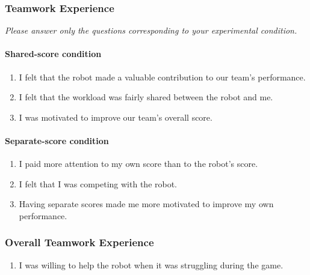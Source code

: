 \subsubsection{Teamwork Experience}

\textit{Please answer only the questions corresponding to your experimental condition.}

\paragraph{Shared-score condition}

\begin{enumerate}[leftmargin=*, itemsep=0.8em, start=6]

    \item I felt that the robot made a valuable contribution to our team's performance.

    \item I felt that the workload was fairly shared between the robot and me.

    \item I was motivated to improve our team's overall score.

\end{enumerate}

\paragraph{Separate-score condition}

\begin{enumerate}[leftmargin=*, itemsep=0.8em, start=6]

    \item I paid more attention to my own score than to the robot's score.

    \item I felt that I was competing with the robot.

    \item Having separate scores made me more motivated to improve my own performance.

\end{enumerate}

\subsubsection{Overall Teamwork Experience}

\begin{enumerate}[leftmargin=*, itemsep=0.8em, start=9]

    \item I was willing to help the robot when it was struggling during the game.

\end{enumerate}

